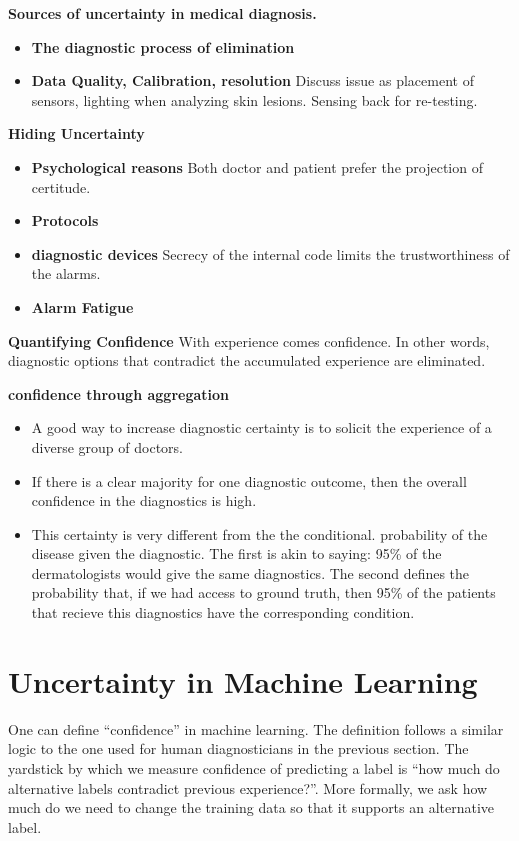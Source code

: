\documentclass[9pt,twocolumn,twoside]{pnas-new}
\begin{document}
{\bf Sources of uncertainty in medical diagnosis.}
\begin{itemize}
  \item{\bf The diagnostic process of elimination}
  \item{\bf Data Quality, Calibration, resolution} Discuss issue as
    placement of sensors, lighting when analyzing skin lesions. Sensing back for re-testing.
  \end{itemize}

 {\bf Hiding Uncertainty}
  \begin{itemize}
    \item {\bf Psychological reasons} Both doctor and patient prefer
      the projection of certitude.
    \item {\bf Protocols}
    \item {\bf diagnostic devices} Secrecy of the internal code limits
      the trustworthiness of the alarms.
    \item{\bf Alarm Fatigue}
  \end{itemize}

  {\bf Quantifying Confidence} With experience comes confidence. In
  other words, diagnostic options that contradict the accumulated
  experience are eliminated.
  
  {\bf confidence through aggregation}
  \begin{itemize}
    \item A good way to increase diagnostic certainty is to solicit
      the experience of a diverse group of doctors.
    \item If there is a clear majority for one diagnostic outcome,
      then the overall confidence in the diagnostics is high.
    \item This certainty is very different from the the conditional.
      probability of the disease given the diagnostic. The first is
      akin to saying: 95\% of the dermatologists would give the same
      diagnostics. The second defines the probability that, if we had
      access to ground truth, then 95\% of the patients that recieve
      this diagnostics have the corresponding condition.
    \end{itemize}
    
\section*{Uncertainty in Machine Learning}

One can define ``confidence'' in machine learning. The definition follows a
similar logic to the one used for human diagnosticians in the previous
section. The yardstick by which we measure confidence of predicting a
label is ``how much do alternative labels contradict previous
experience?''.
More formally, we ask how much do we need to change the training data
so that it supports an alternative label.
\end{document}
